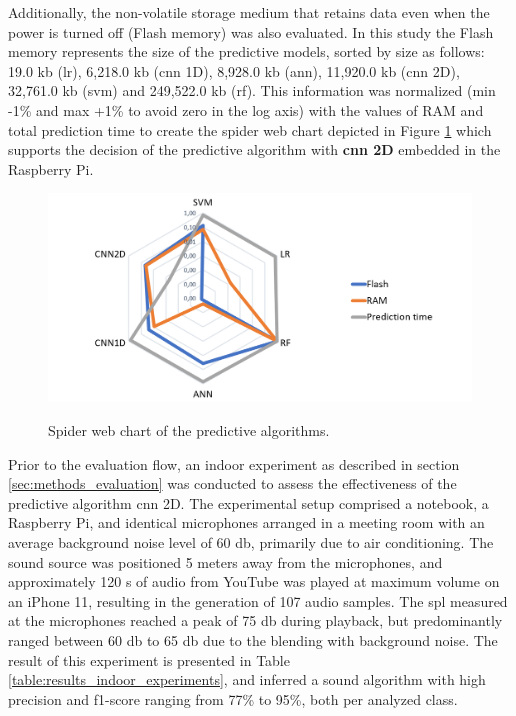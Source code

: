 Additionally, the non-volatile storage medium that retains data even when the power is turned off (Flash memory) was also evaluated. In this study the Flash memory represents the size of the predictive models, sorted by size as follows: 19.0 \gls{k}\gls{b} (\gls{lr}), 6,218.0 \gls{k}\gls{b} (\gls{cnn} 1D), 8,928.0 \gls{k}\gls{b} (\gls{ann}), 11,920.0 \gls{k}\gls{b} (\gls{cnn} 2D), 32,761.0 \gls{k}\gls{b} (\gls{svm}) and 249,522.0 \gls{k}\gls{b} (\gls{rf}). This information was normalized (min -1\% and max +1\% to avoid zero in the log axis) with the values of RAM and total prediction time to create the spider web chart depicted in Figure \ref{fig:Results_spider_chart_us8k_av_cnn2d} which supports the decision of the predictive algorithm with \textbf{\gls{cnn} 2D} embedded in the Raspberry Pi.

\begin{figure}[htbp]
    \raggedright
        \caption{Spider web chart of the predictive algorithms.}
        \includegraphics[width=1\textwidth]{resources/images/060-results/Results_spider_chart_us8k_av_cnn2d.png}
        \label{fig:Results_spider_chart_us8k_av_cnn2d}
\end{figure}

Prior to the evaluation flow, an indoor experiment as described in section \ref{sec:methods_evaluation} was conducted to assess the effectiveness of the predictive algorithm \gls{cnn} 2D. The experimental setup comprised a notebook, a Raspberry Pi, and identical microphones arranged in a meeting room with an average background noise level of 60 \gls{db}, primarily due to air conditioning. The sound source was positioned 5 meters away from the microphones, and approximately 120 \gls{s} of audio from YouTube was played at maximum volume on an iPhone 11, resulting in the generation of 107 audio samples. The \gls{spl} measured at the microphones reached a peak of 75 \gls{db} during playback, but predominantly ranged between 60 \gls{db} to 65 \gls{db} due to the blending with background noise. The result of this experiment is presented in Table \ref{table:results_indoor_experiments}, and inferred a sound algorithm with high precision and f1-score ranging from 77\% to 95\%, both per analyzed class. 

